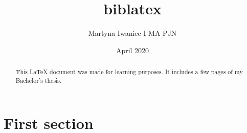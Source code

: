 \documentclass{article}
\title{biblatex}
\author{Martyna Iwaniec I MA PJN}
\date{April 2020}
\begin{document}
\maketitle
\begin{abstract}
This \LaTeX{} document was made for learning purposes. It includes a few pages of my Bachelor's thesis.
\end{abstract}

\maketitle

\tableofcontents

\section{First section}
\end{document}
